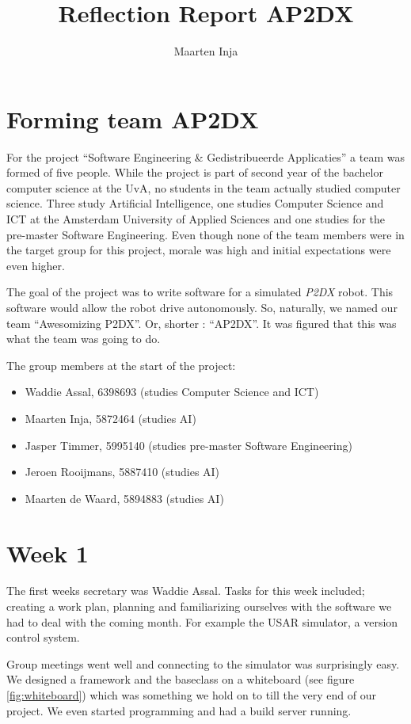 \documentclass[a4paper,10pt]{article}
\title{Reflection Report AP2DX}
\author{Maarten Inja}
\begin{document}
\maketitle

\section{Forming team AP2DX}
For the project ``Software Engineering \& Gedistribueerde Applicaties'' a team was formed of five people. 
While the project is part of second year of the bachelor computer science at the UvA, no students in the 
team actually studied computer science. Three study Artificial Intelligence, one studies 
Computer Science and ICT at the Amsterdam University of Applied Sciences and one studies for the 
pre-master Software Engineering. Even though none of the team members were in the target group for this
project, morale was high and initial expectations were even higher.

The goal of the project was to write software for a simulated \emph{P2DX} robot. This software would
allow the robot drive autonomously. So, naturally, we named our team ``Awesomizing P2DX''. Or, shorter
: ``AP2DX''. It was
figured that this was what the team was going to do. 

The group members at the start of the project:
\begin{itemize}
    \item Waddie Assal, 6398693 (studies Computer Science and ICT) 
    \item Maarten Inja, 5872464 (studies AI)
    \item Jasper Timmer, 5995140 (studies pre-master Software Engineering)
    \item Jeroen Rooijmans, 5887410 (studies AI)
    \item Maarten de Waard, 5894883 (studies AI)
\end{itemize}

\section{Week 1}
The first weeks secretary was Waddie Assal. Tasks for this week included; creating a work plan, planning
and familiarizing ourselves with the software we had to deal with the coming month. For example the USAR simulator, 
a version control system. 

Group meetings went well and connecting to the simulator was surprisingly easy. We designed a framework and the
baseclass on a whiteboard (see figure \ref{fig:whiteboard}) which was something we hold on to till the very end
of our project. We even started programming and had a build server running.
\end{document}
